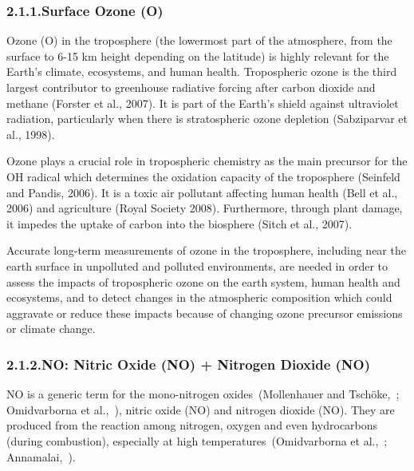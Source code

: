 \documentclass[9pt]{article}
\begin{document}
\subsubsection{2.1.1.\hspace*{0.5em}Surface Ozone (O)}\label{sec-surface-ozone-o3}%

\noindent{}Ozone (O) in the troposphere (the lowermost part of the atmosphere, from the surface to 6-15 km height depending on the latitude) is highly relevant for the Earth’s climate, ecosystems, and human health.
Tropospheric ozone is the third largest contributor to greenhouse radiative forcing after carbon dioxide and methane (Forster et al., 2007).
It is part of the Earth’s shield against ultraviolet radiation, particularly when there is stratospheric ozone depletion (Sabziparvar et al., 1998).%

Ozone plays a crucial role in tropospheric chemistry as the main precursor for the OH radical which determines the oxidation capacity of the troposphere (Seinfeld and Pandis, 2006). 
It is a toxic air pollutant affecting human health (Bell et al., 2006) and agriculture (Royal Society 2008).
Furthermore, through plant damage, it impedes the uptake of carbon into the biosphere (Sitch et al., 2007).%

Accurate long-term measurements of ozone in the troposphere, including near the earth surface in unpolluted and polluted environments, are needed in order to assess the impacts of tropospheric ozone on the earth system, human health and ecosystems, and to detect changes in the atmospheric composition which could aggravate or reduce these impacts because of changing ozone precursor emissions or climate change.%

\subsubsection{2.1.2.\hspace*{0.5em}NO: Nitric Oxide (NO) + Nitrogen Dioxide (NO)}\label{sec-nox--nitric-oxide-no-nitrogen-dioxide-no2}%

\noindent{}NO is a generic term for the mono-nitrogen oxides~(Mollenhauer and Tschöke,~; Omidvarborna et al.,~), nitric oxide (NO) and nitrogen dioxide (NO).
They are produced from the reaction among nitrogen, oxygen and even hydrocarbons (during combustion), especially at high temperatures~(Omidvarborna et al.,~; Annamalai,~).%
\end{document}
